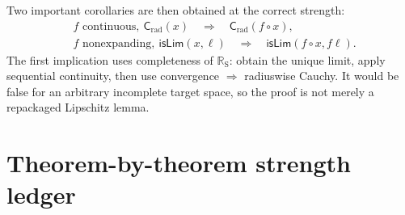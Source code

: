 \documentclass[11pt,a4paper]{article}
\newcommand{\RS}{\mathbb{R}_{\mathrm S}}
\newcommand{\Crad}{\mathsf{C}_{\mathrm{rad}}}
\begin{document}
Two important corollaries are then obtained at the correct strength:
\begin{align*}
  &f\text{ continuous},\ \Crad(x)
    \quad\Longrightarrow\quad \Crad(f\circ x),\\
  &f\text{ nonexpanding},\ \mathsf{isLim}(x,\ell)
    \quad\Longrightarrow\quad \mathsf{isLim}(f\circ x,f\ell).
\end{align*}
The first implication uses completeness of $\RS$: obtain the unique limit, apply sequential
continuity, then use convergence $\Rightarrow$ radiuswise Cauchy.  It would be false for an
arbitrary incomplete target space, so the proof is not merely a repackaged Lipschitz lemma.

\section{Theorem-by-theorem strength ledger}
\end{document}

